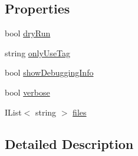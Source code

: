 \subsection*{Properties}
\begin{DoxyCompactItemize}
\item 
bool \hyperlink{a00019_a5dc9d9db767738237e988f95fc0330f4}{dry\-Run}
\item 
string \hyperlink{a00019_ab6162338f9606a836f3101fe0e228249}{only\-Use\-Tag}
\item 
bool \hyperlink{a00022_a89964ea17bd19caf00cb5bff563ed01c}{show\-Debugging\-Info}
\item 
bool \hyperlink{a00022_ada4d83d1756918f362d55f6649b82b17}{verbose}
\item 
I\-List$<$ string $>$ \hyperlink{a00022_aa93cbb1bc1d5328e0a417012621e92d2}{files}
\end{DoxyCompactItemize}


\subsection{Detailed Description}


